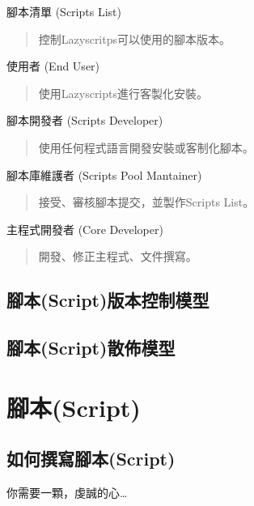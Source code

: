 \documentclass[letterpaper,10pt,english]{manual}
\begin{document}
腳本清單 (Scripts List)
\begin{quote}

控制Lazyscritps可以使用的腳本版本。
\end{quote}

使用者 (End User)
\begin{quote}

使用Lazyscripts進行客製化安裝。
\end{quote}

腳本開發者 (Scripts Developer)
\begin{quote}

使用任何程式語言開發安裝或客制化腳本。
\end{quote}

腳本庫維護者 (Scripts Pool Mantainer)
\begin{quote}

接受、審核腳本提交，並製作Scripts List。
\end{quote}

主程式開發者 (Core Developer)
\begin{quote}

開發、修正主程式、文件撰寫。
\end{quote}


\section{腳本(Script)版本控制模型}


\section{腳本(Script)散佈模型}

\resetcurrentobjects


\chapter{腳本(Script)}


\section{如何撰寫腳本(Script)}

你需要一顆，虔誠的心…
\end{document}
